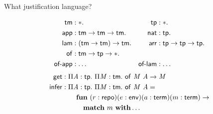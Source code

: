 \documentclass{beamer}
\theoremstyle{example}
\begin{document}
\begin{frame}{What justification language?}
  \begin{example}
    \vspace{-1.5em}
    \small
    \begin{align*}
      \text{\textsf{tm}} &: \mathsf{*}. &
      \text{\textsf{tp}} &: \mathsf{*}.\\
      \text{\textsf{app}} &: \text{\textsf{tm}}\to \text{\textsf{tm}}\to \text{\textsf{tm}}.  &
      \text{\textsf{nat}} &: \text{\textsf{tp}}.\\
      \text{\textsf{lam}} &: (\text{\textsf{tm}}\to \text{\textsf{tm}})\to \text{\textsf{tm}}. &
      \text{\textsf{arr}} &: \text{\textsf{tp}} \to \text{\textsf{tp}} \to \text{\textsf{tp}}. \\
      \text{\textsf{of}} &: \text{\textsf{tm}} \to \text{\textsf{tp}} \to \mathsf{*}. \\
      \text{\textsf{of-app}} &: \ldots &
      \text{\textsf{of-lam}} &: \ldots
    \end{align*}
    \begin{align*}
      \text{\textsf{get}} &: \Pi{\ensuremath{\text{\textit{A}}}}:{\text{\textsf{tp}}}.\  \Pi{\ensuremath{\text{\textit{M}}}}:{\text{\textsf{tm}}}.\ 
      {\text{\textsf{of}}}\ {\text{\textit{M}}}\ {\text{\textit{A}}} \to \text{\textit{M}} \\
      \text{\textsf{infer}} &:  \Pi{\ensuremath{\text{\textit{A}}}}:{\text{\textsf{tp}}}.\  \Pi{\ensuremath{\text{\textit{M}}}}:{\text{\textsf{tm}}}.\ 
      {\text{\textsf{of}}}\ {\text{\textit{M}}}\ {\text{\textit{A}}} = \\
      & \qquad \mathbf{fun}\ (r : \text{\textsf{repo}}) (e : \text{\textsf{env}}) (a :
      \text{\textsf{term}}) (m : \text{\textsf{term}}) \to \\ & \qquad\quad \mathbf{match}\ m\
      \mathbf{with} \ldots
    \end{align*}
  \end{example}
\end{frame}
\end{document}
